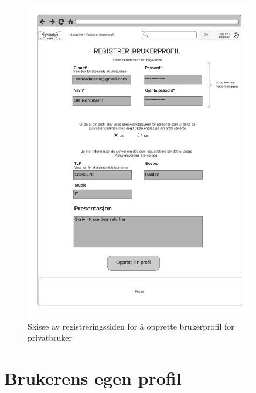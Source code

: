 \begin{figure}[H]
\centering
\includegraphics[width=0.9\textwidth]{Illustrasjoner/Skisser/2.0/2-10-opprett-brukerprofil.png}
\caption{Skisse av registreringssiden for å opprette brukerprofil for privatbruker}
\label{vedlegg:2-10-reg-bruker}
\end{figure}

\section{Brukerens egen profil}

